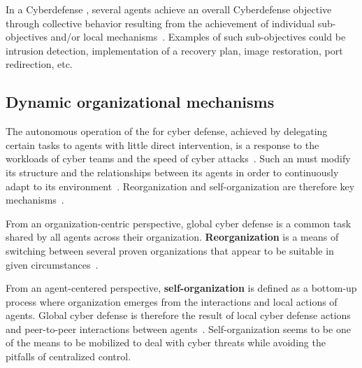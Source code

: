 In a Cyberdefense , several agents achieve an overall Cyberdefense objective through collective behavior resulting from the achievement of individual sub-objectives and/or local mechanisms~\cite {jamont2015meeting}.
Examples of such sub-objectives could be intrusion detection, implementation of a recovery plan, image restoration, port redirection, etc.

\subsection{Dynamic organizational mechanisms}

The autonomous operation of the  for cyber defense, achieved by delegating certain tasks to agents with little direct intervention, is a response to the workloads of cyber teams and the speed of cyber attacks~\cite{ieeesp_KottT20}.
Such an  must modify its structure and the relationships between its agents in order to continuously adapt to its environment~\cite{theron_autonomous_2021}.
Reorganization and self-organization are therefore key mechanisms~\cite {Picard2009reorganisation}.

From an organization-centric perspective, global cyber defense is a common task shared by all agents across their organization.
\textbf{Reorganization} is a means of switching between several proven organizations that appear to be suitable in given circumstances~\cite{Picard2009reorganisation}.

From an agent-centered perspective, \textbf{self-organization} is defined as a bottom-up process where organization emerges from the interactions and local actions of agents.
Global cyber defense is therefore the result of local cyber defense actions and peer-to-peer interactions between agents~\cite {Picard2009reorganisation}.
Self-organization seems to be one of the means to be mobilized to deal with cyber threats while avoiding the pitfalls of centralized control.



